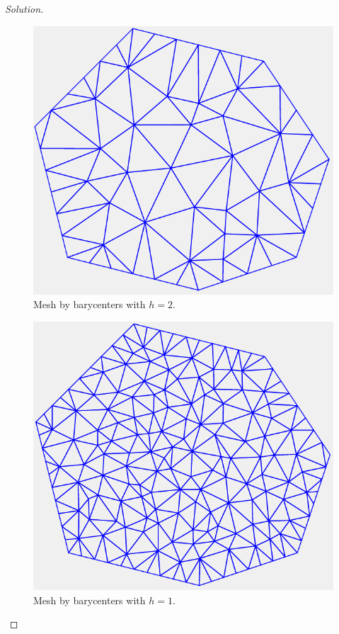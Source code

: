 \documentclass[11pt,a4paper,center,notitlepage]{article}
\numberwithin{equation}{section}
\begin{document}
\begin{proof}[Solution]
\begin{figure}[H]
\centering
\includegraphics[scale=0.9]{mesh_by_barycenter_2}
\caption{Mesh by barycenters with $h=2$.}
\end{figure}

\begin{figure}[H]
\centering
\includegraphics[scale=0.9]{mesh_by_barycenter_1}
\caption{Mesh by barycenters with $h=1$.}
\end{figure}


\end{proof}
\end{document}
